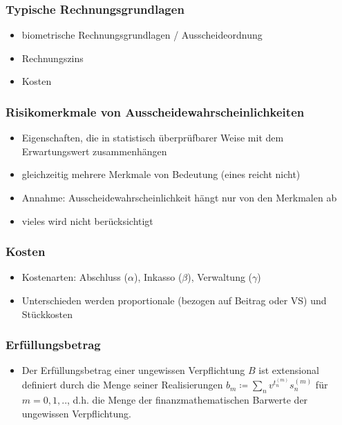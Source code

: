 \documentclass[12pt]{report}
\theoremstyle{dotless}
\theoremstyle{definition}
\begin{document}
\subsubsection{Typische Rechnungsgrundlagen}
\begin{itemize}
	\item biometrische Rechnungsgrundlagen / Ausscheideordnung
	\item Rechnungszins
	\item Kosten
\end{itemize}

\subsubsection{Risikomerkmale von Ausscheidewahrscheinlichkeiten}
\begin{itemize}
	\item Eigenschaften, die in statistisch überprüfbarer Weise mit dem Erwartungswert zusammenhängen
	\item gleichzeitig mehrere Merkmale von Bedeutung (eines reicht nicht)
	\item Annahme: Ausscheidewahrscheinlichkeit hängt nur von den Merkmalen ab
	\item vieles wird nicht berücksichtigt
\end{itemize}

\subsubsection{Kosten}
\begin{itemize}
	\item Kostenarten: Abschluss ($\alpha$), Inkasso ($\beta$), Verwaltung ($\gamma$)
	\item Unterschieden werden proportionale (bezogen auf Beitrag oder VS) und Stückkosten
\end{itemize}

\subsubsection{Erfüllungsbetrag}
\begin{itemize}
	\item Der Erfüllungsbetrag einer ungewissen Verpflichtung $B$ ist extensional definiert durch die Menge seiner Realisierungen $b_m \coloneqq \sum_n v^{t_n^{(m)}}s_n^{(m)}$ für $m=0,1,..$, d.h. die Menge der finanzmathematischen Barwerte der ungewissen Verpflichtung.
\end{itemize}
\end{document}
